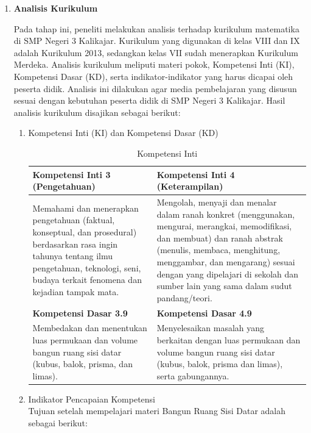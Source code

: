 \documentclass[12pt]{article}
\begin{document}
\begin{enumerate}[leftmargin=1cm, label=\arabic*.]
\begin{enumerate}[label=\textbf{\alph*.}]
        \item \textbf{Analisis Kurikulum}
        
        \hspace*{1cm}Pada tahap ini, peneliti melakukan analisis terhadap kurikulum matematika di SMP Negeri 3 Kalikajar. Kurikulum yang digunakan di kelas VIII dan IX adalah Kurikulum 2013, sedangkan kelas VII sudah menerapkan Kurikulum Merdeka. Analisis kurikulum meliputi materi pokok, Kompetensi Inti (KI), Kompetensi Dasar (KD), serta indikator-indikator yang harus dicapai oleh peserta didik. Analisis ini dilakukan agar media pembelajaran yang disusun sesuai dengan kebutuhan peserta didik di SMP Negeri 3 Kalikajar. Hasil analisis kurikulum disajikan sebagai berikut:

        \begin{enumerate}
            \item Kompetensi Inti (KI) dan Kompetensi Dasar (KD)
            \begin{table}[h]
            \centering
            \caption{Kompetensi Inti}
            \renewcommand{\arraystretch}{1.3} %
            \begin{tabular}{|p{6cm}|p{6cm}|}
            \hline
            \textbf{Kompetensi Inti 3 (Pengetahuan)} & \textbf{Kompetensi Inti 4 (Keterampilan)} \\ 
            \hline
            Memahami dan menerapkan pengetahuan (faktual, konseptual, dan prosedural) berdasarkan rasa ingin tahunya tentang ilmu pengetahuan, teknologi, seni, budaya terkait fenomena dan kejadian tampak mata. & Mengolah, menyaji dan menalar dalam ranah konkret (menggunakan, mengurai, merangkai, memodifikasi, dan membuat) dan ranah abstrak (menulis, membaca, menghitung, menggambar, dan mengarang) sesuai dengan yang dipelajari di sekolah dan sumber lain yang sama dalam sudut pandang/teori. \\ 
            \hline
            \textbf{Kompetensi Dasar 3.9} & \textbf{Kompetensi Dasar 4.9} \\ 
            \hline
            Membedakan dan menentukan luas permukaan dan volume bangun ruang sisi datar (kubus, balok, prisma, dan limas). & Menyelesaikan masalah yang berkaitan dengan luas permukaan dan volume bangun ruang sisi datar (kubus, balok, prisma dan limas), serta gabungannya. \\ 
            \hline
            \end{tabular}
            \end{table}
            \item Indikator Pencapaian Kompetensi \\
            Tujuan setelah mempelajari materi Bangun Ruang Sisi Datar adalah sebagai berikut:


\end{enumerate}
\end{enumerate}
\end{enumerate}
\end{document}
